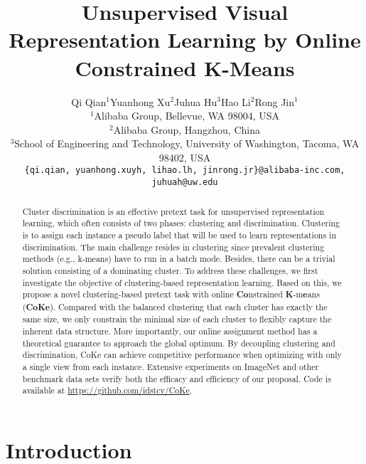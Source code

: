 \documentclass[10pt,twocolumn,letterpaper]{article}
\begin{document}
\title{Unsupervised Visual Representation Learning by Online Constrained K-Means}

\author{Qi Qian$^1$\quad Yuanhong Xu$^2$\quad Juhua Hu$^3$\quad Hao Li$^2$\quad Rong Jin$^1$\\
$^1$Alibaba Group, Bellevue, WA 98004, USA\\
$^2$Alibaba Group, Hangzhou, China\\
$^3$School of Engineering and Technology, University of Washington, Tacoma, WA 98402, USA\\
{\tt\small \{qi.qian, yuanhong.xuyh, lihao.lh, jinrong.jr\}@alibaba-inc.com, juhuah@uw.edu}
}

\maketitle

\begin{abstract}
Cluster discrimination is an effective pretext task for unsupervised representation learning, which often consists of two phases: clustering and discrimination. Clustering is to assign each instance a pseudo label that will be used to learn representations in discrimination. The main challenge resides in clustering since prevalent clustering methods (e.g., k-means) have to run in a batch mode. Besides, there can be a trivial solution consisting of a dominating cluster. To address these challenges, we first investigate the objective of clustering-based representation learning. Based on this, we propose a novel clustering-based pretext task with online \textbf{Co}nstrained \textbf{K}-m\textbf{e}ans (\textbf{CoKe}). Compared with the balanced clustering that each cluster has exactly the same size, we only constrain the minimal size of each cluster to flexibly capture the inherent data structure. More importantly, our online assignment method has a theoretical guarantee to approach the global optimum. By decoupling clustering and discrimination, CoKe can achieve competitive performance when optimizing with only a single view from each instance. Extensive experiments on ImageNet and other benchmark data sets verify both the efficacy and efficiency of our proposal. Code is available at \url{https://github.com/idstcv/CoKe}.
\end{abstract}

\section{Introduction}
\end{document}
